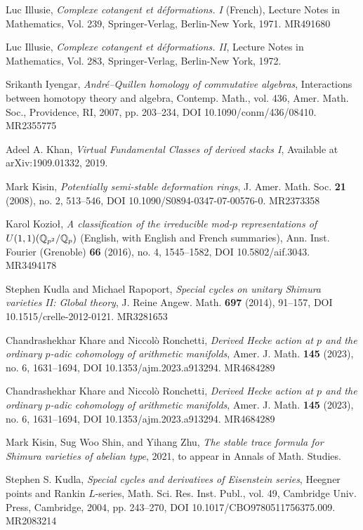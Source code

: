 \begin{refs}
\item[{[Ill71]}] Luc Illusie, \emph{Complexe cotangent et d\'eformations. I} (French), Lecture Notes in Mathematics, Vol. 239, Springer-Verlag, Berlin-New York, 1971. MR491680
\item[{[Ill72]}] Luc Illusie, \emph{Complexe cotangent et d\'eformations. II}, Lecture Notes in Mathematics, Vol. 283, Springer-Verlag, Berlin-New York, 1972.
\item[{[Iye07]}] Srikanth Iyengar, \emph{Andr\'e--Quillen homology of commutative algebras}, Interactions between homotopy theory and algebra, Contemp. Math., vol. 436, Amer. Math. Soc., Providence, RI, 2007, pp. 203--234, DOI 10.1090/conm/436/08410. MR2355775
\item[{[Kha19]}] Adeel A. Khan, \emph{Virtual Fundamental Classes of derived stacks I}, Available at arXiv:1909.01332, 2019.
\item[{[Kis08]}] Mark Kisin, \emph{Potentially semi-stable deformation rings}, J. Amer. Math. Soc. \textbf{21} (2008), no. 2, 513--546, DOI 10.1090/S0894-0347-07-00576-0. MR2373358
\item[{[Koz16]}] Karol Kozio\l, \emph{A classification of the irreducible mod-$p$ representations of $U(1,1)(\mathbb{Q}_{p^2}/\mathbb{Q}_p)$} (English, with English and French summaries), Ann. Inst. Fourier (Grenoble) \textbf{66} (2016), no. 4, 1545--1582, DOI 10.5802/aif.3043. MR3494178
\item[{[KR14]}] Stephen Kudla and Michael Rapoport, \emph{Special cycles on unitary Shimura varieties II: Global theory}, J. Reine Angew. Math. \textbf{697} (2014), 91--157, DOI 10.1515/crelle-2012-0121. MR3281653
\item[{[KR23a]}] Chandrashekhar Khare and Niccol\`o Ronchetti, \emph{Derived Hecke action at $p$ and the ordinary $p$-adic cohomology of arithmetic manifolds}, Amer. J. Math. \textbf{145} (2023), no. 6, 1631--1694, DOI 10.1353/ajm.2023.a913294. MR4684289
\item[{[KR23b]}] Chandrashekhar Khare and Niccol\`o Ronchetti, \emph{Derived Hecke action at $p$ and the ordinary $p$-adic cohomology of arithmetic manifolds}, Amer. J. Math. \textbf{145} (2023), no. 6, 1631--1694, DOI 10.1353/ajm.2023.a913294. MR4684289
\item[{[KSZ21]}] Mark Kisin, Sug Woo Shin, and Yihang Zhu, \emph{The stable trace formula for Shimura varieties of abelian type}, 2021, to appear in Annals of Math. Studies.
\item[{[Kud04]}] Stephen S. Kudla, \emph{Special cycles and derivatives of Eisenstein series}, Heegner points and Rankin $L$-series, Math. Sci. Res. Inst. Publ., vol. 49, Cambridge Univ. Press, Cambridge, 2004, pp. 243--270, DOI 10.1017/CBO9780511756375.009. MR2083214

\end{refs}

